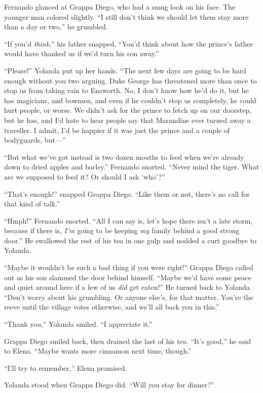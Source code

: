 \documentclass[10pt]{book}
\begin{document}
Fernando glanced at Grappa Diego, who had a smug look on his face. The younger man colored slightly. ``I still don't think we should let them stay more than a day or two,'' he grumbled.

``If you'd \emph{think},'' his father snapped, ``You'd think about how the prince's father would have thanked us if we'd turn his son away.''

``Please!'' Yolanda put up her hands. ``The next few days are going to be hard enough without you two arguing. Duke George has threatened more than once to stop us from taking rain to Ensworth. No, I don't know how he'd do it, but he has magicians, and bowmen, and even if he couldn't stop us completely, he could hurt people, or worse. We didn't ask for the prince to fetch up on our doorstep, but he has, and I'd hate to hear people say that Marandine ever turned away a traveller. I admit, I'd be happier if it was just the prince and a couple of bodyguards, but---''

``But what we've got instead is two dozen mouths to feed when we're already down to dried apples and barley.'' Fernando snorted. ``Never mind the tiger. What are we supposed to feed it? Or should I ask 'who'?''

``That's enough!'' snapped Grappa Diego. ``Like them or not, there's no call for that kind of talk.''

``Hmph!'' Fernando snorted. ``All I can say is, let's hope there isn't a late storm, because if there is, \emph{I'm} going to be keeping \emph{my} family behind a good strong door.'' He swallowed the rest of his tea in one gulp and nodded a curt goodbye to Yolanda.

``Maybe it wouldn't be such a bad thing if you were right!'' Grappa Diego called out as his son slammed the door behind himself. ``Maybe we'd have some peace and quiet around here if a few of us \emph{did} get eaten!'' He turned back to Yolanda. ``Don't worry about his grumbling. Or anyone else's, for that matter. You're the reeve until the village votes otherwise, and we'll all back you in this.''

``Thank you,'' Yolanda smiled. ``I appreciate it.''

Grappa Diego smiled back, then drained the last of his tea. ``It's good,'' he said to Elena. ``Maybe wants more cinnamon next time, though.''

``I'll try to remember,'' Elena promised.

Yolanda stood when Grappa Diego did. ``Will you stay for dinner?''
\end{document}
